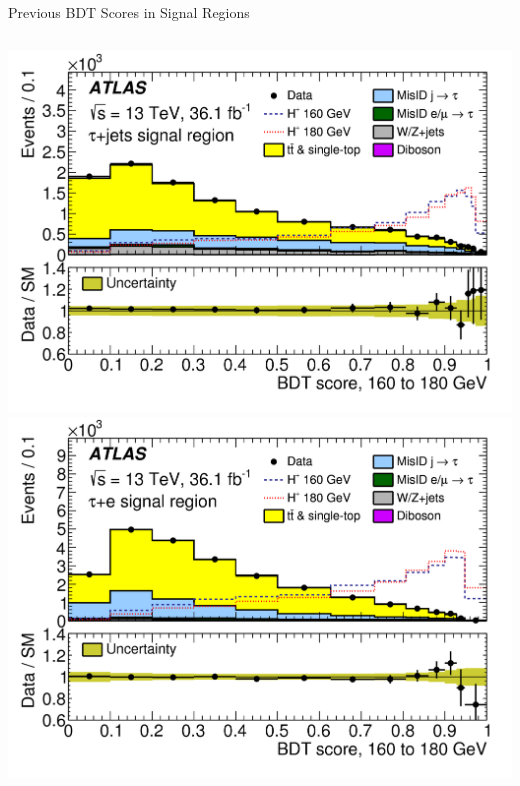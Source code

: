 \documentclass[aspectratio=169,xcolor=table]{beamer}
\begin{document}
\begin{frame}[t]{Previous BDT Scores in Signal Regions}
\begin{columns}[t]
          \includegraphics[height=.4\textheight,keepaspectratio=true]{taujet_SR_2018/taujet_SR_160to180_2018.png}
          \includegraphics[height=.4\textheight,keepaspectratio=true]{tauel_SR_2018/tauel_SR_160to180_2018.png}



\end{columns}
\end{frame}
\end{document}
